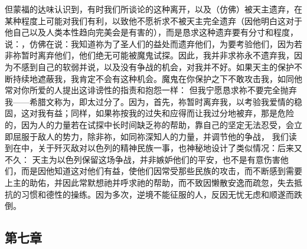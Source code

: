 但蒙福的达味认识到，有时我们所谈论的这种离开，以及（仿佛）被天主遗弃，在某种程度上可能对我们有利，以致他不愿祈求不被天主完全遗弃（因他明白这对于他自己以及人类本性趋向完美会是有害的），而是恳求这种遗弃要有分寸和程度，说：，仿佛在说：我知道祢为了圣人们的益处而遗弃他们，为要考验他们，因为若非祢暂时离弃他们，他们绝无可能被魔鬼试探。因此，我并非求祢永不遗弃我，因为不感到自己的软弱并说，以及没有争战的机会，对我并不好。如果天主的保护不断持续地遮蔽我，我肯定不会有这种机会。魔鬼在你保护之下不敢攻击我，如同他常对你所爱的人提出这诽谤性的指责和抱怨一样：\newline{} 但我宁愿恳求祢不要完全抛弃我——希腊文称为，即太过分了。因为，首先，祢暂时离弃我，以考验我爱情的稳固，这对我有益；同样，如果祢按我的过失和应得而让我过分地被弃，那是危险的，因为人的力量若在试探中长时间缺乏祢的帮助，靠自己的坚定无法忍受，会立即屈服于敌人的势力，除非祢，如同祢深知人的力量，并调节他的争战，\newline{} 我们读到在中，关于歼灭敌对以色列的精神民族一事，也神秘地设计了类似情况：\newline{}后来又不久：\newline{} 天主为以色列保留这场争战，并非嫉妒他们的平安，也不是有意伤害他们，而是因他知道这对他们有益，使他们因常受那些民族的攻击，而不断感到需要上主的助佑，并因此常默想祂并呼求祂的帮助，而不致因懒散安逸而疏忽，失去抵抗的习惯和德性的操练。因为多次，逆境不能征服的人，反因无忧无虑和顺遂而跌倒。\par


\subsection{第七章}

\par

